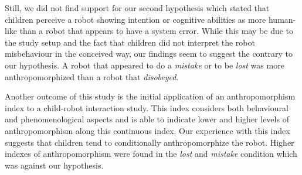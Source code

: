 \documentclass[letterpaper, 10pt, conference]{ieeeconf}
\begin{document}
%
%
%


Still, we did not find support for our second hypothesis which stated that children
perceive a robot showing intention or cognitive abilities as more human-like
than a robot that appears to have a system error. While this may be due to the study
setup and the fact that children did not interpret the robot misbehaviour in the
conceived way, our findings seem to suggest the contrary to our hypothesis. A
robot that appeared to do a \textit{mistake} or to be \textit{lost} was more
anthropomorphized than a robot that \textit{disobeyed}.


Another outcome of this study is the initial application of an
anthropomorphism index to a child-robot interaction study. This index
considers both behavioural and phenomenological aspects and is able to indicate
lower and higher levels of anthropomorphism along this continuous index.  Our
experience with this index suggests that children tend to conditionally
anthropomorphize the robot. Higher indexes of anthropomorphism were found in the
\textit{lost} and \textit{mistake} condition which was against our hypothesis.
\end{document}

